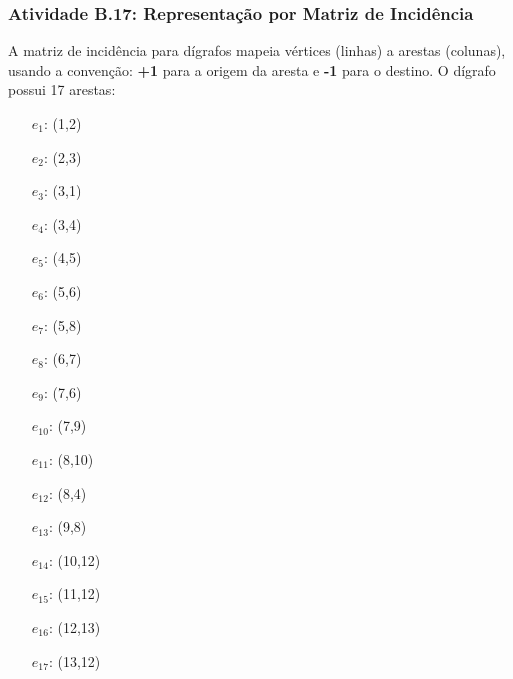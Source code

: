 \documentclass[a4paper,12pt]{article}
\begin{document}
\subsubsection*{Atividade B.17: Representação por Matriz de Incidência}
A matriz de incidência para dígrafos mapeia vértices (linhas) a arestas (colunas), usando a convenção: \textbf{+1} para a origem da aresta e \textbf{-1} para o destino. O dígrafo possui 17 arestas:
\begin{multicols}{3}
\begin{itemize}[nosep, leftmargin=*]
    \item[$e_1$:] (1,2)
    \item[$e_2$:] (2,3)
    \item[$e_3$:] (3,1)
    \item[$e_4$:] (3,4)
    \item[$e_5$:] (4,5)
    \item[$e_6$:] (5,6)
    \item[$e_7$:] (5,8)
    \item[$e_8$:] (6,7)
    \item[$e_9$:] (7,6)
    \item[$e_{10}$:] (7,9)
    \item[$e_{11}$:] (8,10)
    \item[$e_{12}$:] (8,4)
    \item[$e_{13}$:] (9,8)
    \item[$e_{14}$:] (10,12)
    \item[$e_{15}$:] (11,12)
    \item[$e_{16}$:] (12,13)
    \item[$e_{17}$:] (13,12)
\end{itemize}
\end{multicols}
\end{document}
